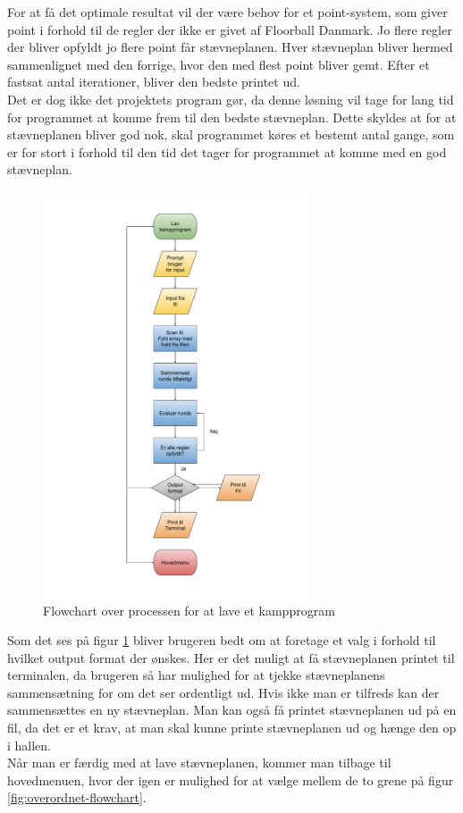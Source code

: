 For at få det optimale resultat vil der være behov for et point-system, som giver point i forhold til de regler der ikke er givet af Floorball Danmark. Jo flere regler der bliver opfyldt jo flere point får stævneplanen. Hver stævneplan bliver hermed sammenlignet med den forrige, hvor den med flest point bliver gemt. Efter et fastsat antal iterationer, bliver den bedste printet ud.\\
Det er dog ikke det projektets program gør, da denne løsning vil tage for lang tid for programmet at komme frem til den bedste stævneplan. Dette skyldes at for at stævneplanen bliver god nok, skal programmet køres et bestemt antal gange, som er for stort i forhold til den tid det tager for programmet at komme med en god stævneplan.

\begin{figure}[H]
  \centering
  \includegraphics[width=0.7\textwidth]{figures/Lavflowchart.pdf}
  \caption{Flowchart over processen for at lave et kampprogram}
  \label{fig:lav-flowchart}
\end{figure}

Som det ses på figur \ref{fig:lav-flowchart} bliver brugeren bedt om at foretage et valg i forhold til hvilket output format der ønskes. Her er det muligt at få stævneplanen printet til terminalen, da brugeren så har mulighed for at tjekke stævneplanens sammensætning for om det ser ordentligt ud. Hvis ikke man er tilfreds kan der sammensættes en ny stævneplan. Man kan også få printet stævneplanen ud på en fil, da det er et krav, at man skal kunne printe stævneplanen ud og hænge den op i hallen.\\
Når man er færdig med at lave stævneplanen, kommer man tilbage til hovedmenuen, hvor der igen er mulighed for at vælge mellem de to grene på figur \ref{fig:overordnet-flowchart}.

